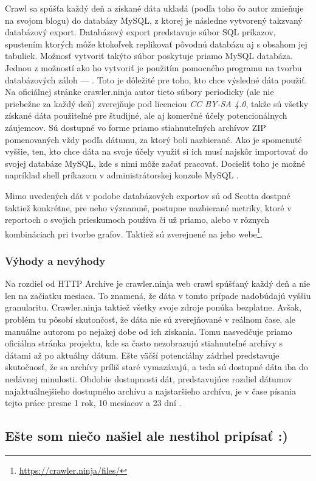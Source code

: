 Crawl sa spúšťa každý deň a získané dáta ukladá (podľa toho čo autor zmieňuje na svojom blogu) do databázy MySQL, z ktorej je následne vytvorený takzvaný databázový export.
Databázový export predstavuje súbor SQL príkazov, spustením ktorých môže ktokoľvek replikovať pôvodnú databázu aj s obsahom jej tabuliek. 
Možnosť vytvoriť takýto súbor poskytuje priamo MySQL databáza. 
Jednou z možností ako ho vytvoriť je použitím pomocného programu na tvorbu databázových záloh ---  \cite{mysql-doc}.
Toto je dôležité pre toho, kto chce výsledné dáta použiť. 
Na oficiálnej stránke crawler.ninja autor tieto súbory periodicky (ale nie priebežne za každý deň) zverejňuje pod licenciou \textit{CC BY-SA 4.0}, takže sú všetky získané dáta použiteľné pre študijné, ale aj komerčné účely potencionálnych záujemcov.
Sú dostupné vo forme priamo stiahnuteľných archívov ZIP pomenovaných vždy podľa dátumu, za ktorý boli nazbierané.
Ako je spomenuté vyššie, ten, kto chce dáta na svoje účely využiť si ich musí najskôr importovať do svojej databáze MySQL, kde s nimi môže začať pracovať.
Docieliť toho je možné napríklad shell príkazom  v administrátorskej konzole MySQL \cite{mysql-doc}.

Mimo uvedených dát v podobe databázových exportov sú od Scotta dostpné taktiež konkrétne, pre neho významné, postupne nazbierané metriky, ktoré v reportoch o svojich prieskumoch používa či už priamo, alebo v rôznych kombináciach pri tvorbe grafov. Taktiež sú zverejnené na jeho webe\footnote{\href{https://crawler.ninja/files/}{https://crawler.ninja/files/}}.

\subsubsection{Výhody a nevýhody}

Na rozdiel od HTTP Archive je crawler.ninja web crawl spúšťaný každý deň a nie len 
na začiatku mesiaca. To znamená, že dáta v tomto prípade nadobúdajú vyššiu granularitu. Crawler.ninja taktiež všetky svoje zdroje ponúka bezplatne.
Avšak, problém tu pôsobí skutončosť, že dáta nie sú zverejňované v reálnom čase, ale manuálne autorom po nejakej dobe od ich získania. Tomu nasvedčuje priamo oficiálna stránka projektu, kde sa často nezobrazujú stiahnuteľné archívy s dátami až po aktuálny dátum.
Ešte väčší potenciálny zádrhel predstavuje skutočnosť, že sa archívy príliš staré vymazávajú, a teda sú dostupné dáta iba do nedávnej minulosti.
Obdobie dostupnosti dát, predstavujúce rozdiel dátumov najaktuálnejšieho dostupného archívu a najstaršieho archívu, je v čase písania tejto práce presne 1 rok, 10 mesiacov a 23 dní \cite{crawler-ninja}.


\subsection{Ešte som niečo našiel ale nestihol pripísať :)}
